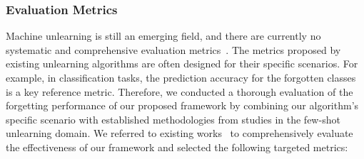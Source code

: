 \documentclass[preprint,12pt]{elsarticle}
\begin{document}
\subsubsection{Evaluation Metrics}

Machine unlearning is still an emerging field, and there are currently no systematic and comprehensive evaluation metrics~\cite{zhang2023review}. The metrics proposed by existing unlearning algorithms are often designed for their specific scenarios. For example, in classification tasks, the prediction accuracy for the forgotten classes is a key reference metric. Therefore, we conducted a thorough evaluation of the forgetting performance of our proposed framework by combining our algorithm’s specific scenario with established methodologies from studies in the few-shot unlearning domain. We referred to existing works~\cite{nguyen2022survey,golatkar2020eternal,yoon2022few,fastchundawat2023zero,tarun2023fast} to comprehensively evaluate the effectiveness of our framework and selected the following targeted metrics:
\end{document}
